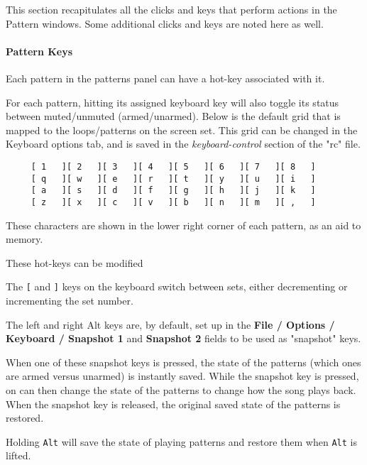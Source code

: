    This section recapitulates all the clicks and keys that perform actions
   in the Pattern windows.  Some additional clicks and keys are noted here
   as well.

\paragraph{Pattern Keys}
\label{paragraph:seq64_patterns_pattern_keys}

   Each pattern in the patterns panel can have a hot-key associated with it.

   For each pattern, hitting its assigned keyboard key will
   also toggle its status between muted/unmuted (armed/unarmed).
   Below is the default grid that is
   mapped to the loops/patterns on the screen set.
   This grid can be changed in the Keyboard options tab, and is
   saved in the \textsl{keyboard-control} section of the
   "rc" file.

   \begin{verbatim}
     [ 1   ][ 2   ][ 3   ][ 4   ][ 5   ][ 6   ][ 7   ][ 8   ]
     [ q   ][ w   ][ e   ][ r   ][ t   ][ y   ][ u   ][ i   ]
     [ a   ][ s   ][ d   ][ f   ][ g   ][ h   ][ j   ][ k   ]
     [ z   ][ x   ][ c   ][ v   ][ b   ][ n   ][ m   ][ ,   ]
   \end{verbatim}

   These characters are shown in the lower right corner of each
   pattern, as an aid to memory.

   These hot-keys can be modified

   \index{keys![}
   The \texttt{[} and
   \index{keys!]}
   \texttt{]} keys on the keyboard
   switch between sets, either decrementing or incrementing the set number.

   The left and right Alt keys are, by default, set up in the
   \textbf{File / Options / Keyboard / Snapshot 1} and
   \textbf{Snapshot 2} fields to be used as "snapshot" keys.

   When one of these snapshot keys is pressed, the state of the patterns
   (which ones are armed versus unarmed) is instantly saved.  While the
   snapshot key is pressed, on can then change the state of the patterns to
   change how the song plays back.  When the snapshot key is released, the
   original saved state of the patterns is restored.

   Holding \texttt{Alt} will save the state of playing patterns and restore
   them when \texttt{Alt} is lifted.

